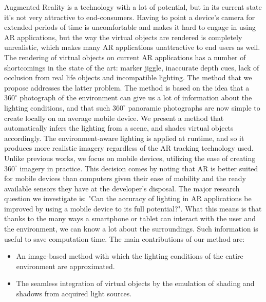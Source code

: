 Augmented Reality is a technology with a lot of potential, but in its current state it's not very attractive to end-consumers. Having to point a device's camera for extended periods of time is uncomfortable and makes it hard to engage in using AR applications, but the way the virtual objects are rendered is completely unrealistic, which makes many AR applications unattractive to end users as well.
The rendering of virtual objects on current AR applications has a number of shortcomings in the state of the art: marker jiggle, inaccurate depth cues, lack of occlusion from real life objects and incompatible lighting.\newline
The method that we propose addresses the latter problem. The method is based on the idea that a $360^{\circ}$  photograph of the environment can give us a lot of information about the lighting conditions, and that such $360^{\circ}$  panoramic photographs are now simple to create locally on an average mobile device. \newline
We present a method that automatically infers the lighting from a scene, and shades virtual objects accordingly. The environment-aware lighting is applied at runtime, and so it produces more realistic imagery regardless of the AR tracking technology used.\newline
 Unlike previous works, we focus on mobile devices, utilizing the ease of creating $360^{\circ}$ imagery in practice. This decision comes by noting that AR is better suited for mobile devices than computers given their ease of mobility and the ready available sensors they have at the developer's disposal.\newline
The major research question we investigate is: "Can the accuracy of lighting in AR applications be improved by using a mobile device to its full potential?". What this means is that thanks to the many ways a smartphone or tablet can interact with the user and the environment, we can know a lot about the surroundings. Such information is useful to save computation time.\newline
The main contributions of our method are:
\begin{itemize}
    \item An image-based method with which the lighting conditions of the entire environment are approximated.
    \item The seamless integration of virtual objects by the emulation of shading and shadows from acquired light sources.
\end{itemize}
